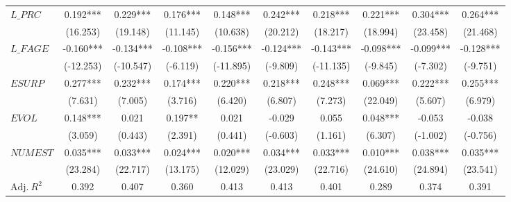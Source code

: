 \begin{landscape}
\begin{spacing}{1.0}
\begin{xltabular}{\linewidth}{X * {9}{S[table-format=5.3]}}
\addlinespace
$L\_PRC$ & 0.192*** & 0.229*** & 0.176*** & 0.148*** & 0.242*** & 0.218*** & 0.221*** & 0.304*** & 0.264***\\
 & (16.253) & (19.148) & (11.145) & (10.638) & (20.212) & (18.217) & (18.994) & (23.458) & (21.468)\\
\addlinespace
$L\_FAGE$ & -0.160*** & -0.134*** & -0.108*** & -0.156*** & -0.124*** & -0.143*** & -0.098*** & -0.099*** & -0.128***\\
 & (-12.253) & (-10.547) & (-6.119) & (-11.895) & (-9.809) & (-11.135) & (-9.845) & (-7.302) & (-9.751)\\
\addlinespace
$ESURP$ & 0.277*** & 0.232*** & 0.174*** & 0.220*** & 0.218*** & 0.248*** & 0.069*** & 0.222*** & 0.255***\\
 & (7.631) & (7.005) & (3.716) & (6.420) & (6.807) & (7.273) & (22.049) & (5.607) & (6.979)\\
\addlinespace
$EVOL$ & 0.148*** & 0.021 & 0.197** & 0.021 & -0.029 & 0.055 & 0.048*** & -0.053 & -0.038\\
 & (3.059) & (0.443) & (2.391) & (0.441) & (-0.603) & (1.161) & (6.307) & (-1.002) & (-0.756)\\
\addlinespace
$NUMEST$ & 0.035*** & 0.033*** & 0.024*** & 0.020*** & 0.034*** & 0.033*** & 0.010*** & 0.038*** & 0.035***\\
 & (23.284) & (22.717) & (13.175) & (12.029) & (23.029) & (22.716) & (24.610) & (24.894) & (23.541)\\
\midrule
$\textrm{Adj.} \: R^2$ & 0.392 & 0.407 & 0.360 & 0.413 & 0.413 & 0.401 & 0.289 & 0.374 & 0.391\\*
\end{xltabular}
\end{spacing}
\endgroup{}
\end{landscape}